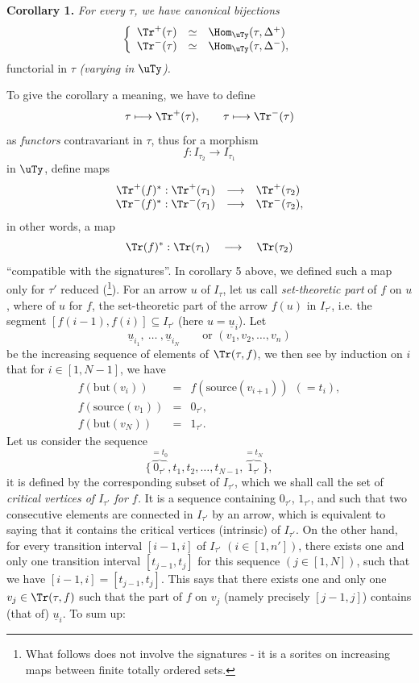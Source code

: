 \textbf{Corollary 1.} \textit{For every $\tau$, we have canonical bijections}
\[
\left\{
\begin{array}{lcl}
\Tr^+(\tau) & \simeq & \Hom_{\uTy}(\tau, \Delta^+) \\
\Tr^-(\tau) & \simeq & \Hom_{\uTy}(\tau, \Delta^-),
\end{array}
\right.
\]
functorial in $\tau$ \textit{(varying in} $\uTy$\textit{).}


To give the corollary a meaning, we have to define
\[
\tau \longmapsto \Tr^+(\tau), \qquad \tau \longmapsto \Tr^-(\tau)
\]
as \textit{functors} contravariant in $\tau$, thus for a morphism
\[
f : I_{\tau_2} \longrightarrow I_{\tau_1}
\]
in $\uTy$, define maps
\[
\begin{array}{rcl}
\Tr^+(f)^* : \Tr^+(\tau_1) & \longrightarrow & \Tr^+(\tau_2) \\
\Tr^-(f)^* : \Tr^-(\tau_1) & \longrightarrow & \Tr^-(\tau_2),
\end{array}
\]
in other words, a map
\[
\Tr(f)^* : \Tr(\tau_1) \quad \longrightarrow \quad \Tr(\tau_2)
\]
``compatible with the signatures''. In corollary 5 above, we defined such a map only for $\tau'$ reduced (\footnote[12]{What follows does not involve the signatures - it is a sorites on increasing maps between finite totally ordered sets.}). For an arrow $u$ of $I_\tau$, let us call \textit{set-theoretic part} of $f$ on $u$, where of $u$ for $f$, the set-theoretic part of the arrow $f(u)$ in $I_{\tau'}$, i.e. the segment $[f(i-1), f(i)] \subseteq I_{\tau'}$ (here $u = \underline{u}_i$). Let %
\[
\underline{u}_{i_1},\ \dots\ ,\underline{u}_{i_N} \qquad \text{or } (v_1, v_2, \dots, v_n)
\] %
be the increasing sequence of elements of $\Tr(\tau, f)$, we then see by induction on $i$ that for $i \in [1, N-1]$, we have
\[
\begin{array}{rcl}
f(\mathrm{but}(v_i)) & = & f(\mathrm{source}(v_{i+1}))\ \ (= t_i), \\
f(\mathrm{source}(v_1)) & = & 0_{\tau'}, \\
f(\mathrm{but}(v_N)) & = & 1_{\tau'}.
\end{array}
\]
Let us consider the sequence
\[
\{\overbrace{0_{\tau'}}^{= t_0}, t_1, t_2, \dots, t_{N-1}, \overbrace{1_{\tau'}}^{= t_N}\},
\]
it is defined by the corresponding subset of $I_{\tau'}$, which we shall call the set of \textit{critical vertices of $I_{\tau'}$ for $f$.} It is a sequence containing $0_{\tau'}$, $1_{\tau'}$, and such that two consecutive elements are connected in $I_{\tau'}$ by an arrow, which is equivalent to saying that it contains the critical vertices (intrinsic) of $I_{\tau'}$. On the other hand, for every transition interval $[i-1, i]$ of $I_{\tau'}$ $(i \in [1, n'])$, %
there exists one and only one transition interval $[t_{j-1}, t_j]$ for this sequence $(j \in [1, N])$, such that we have $[i-1, i] = [t_{j-1}, t_j]$. This says that there exists one and only one $v_j \in \Tr(\tau, f)$ such that the part of $f$ on $v_j$ (namely precisely $[j-1, j]$) contains (that of) $\underline{u}_i$. To sum up:

